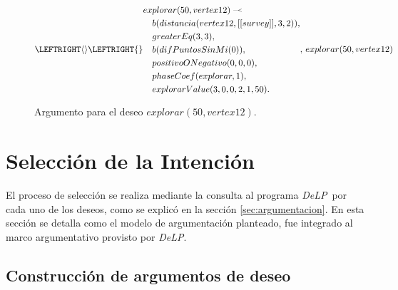 \documentclass[oneside]{book}
\theoremstyle{definition}
\theoremstyle{example}
\newcommand{\DLP}{\mbox{\textit{DeLP}}}
\newcommand{\defleftarrow}{{\raise1.5pt\hbox{\tiny\defleft}}}
\newcommand{\defleft}{\mbox{---\hspace{-1.5pt}\raise.05pt\hbox{$<$}}}
\begin{document}
\begin{figure}


\begin{equation*}
\LEFTRIGHT\langle\rangle{
\LEFTRIGHT\{\}{
\begin{aligned}
ex&plorar(50, vertex12)\; \defleftarrow \; \\
    &b(distancia(vertex12, [[survey]], 3, 2)), \\
    &greaterEq(3, 3),\\
    &b(difPuntosSinMi(0)),\\
    &positivoONegativo(0, 0, 0),\\
    &phaseCoef(explorar, 1),\\
    &explorarValue(3, 0, 0, 2, 1, 50).
\end{aligned}
}
,\, explorar(50, vertex12) 
}
\end{equation*}



\caption{Argumento para el deseo $explorar(50, vertex12)$.}
\label{fig:ejemploArgDeseo}
\end{figure}

\section{Selección de la Intención}

El proceso de selección se realiza mediante la consulta al programa \DLP\ por cada
uno de los deseos, como se explicó en la sección \ref{sec:argumentacion}. 
En esta sección se detalla como el modelo de argumentación planteado, fue integrado al marco
argumentativo provisto por \DLP.

\subsection{Construcción de argumentos de deseo}
\end{document}
